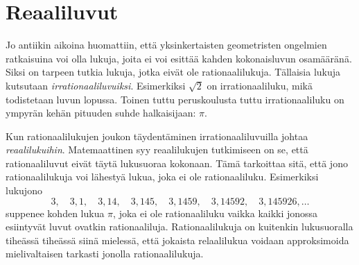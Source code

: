 \chapter{Reaaliluvut}

Jo antiikin aikoina huomattiin, että yksinkertaisten geometristen ongelmien ratkaisuina voi olla lukuja, joita ei voi esittää kahden kokonaisluvun osamääränä. Siksi on tarpeen tutkia lukuja, jotka  eivät ole rationaalilukuja. Tällaisia lukuja kutsutaan \emph{irrationaaliluvuiksi}. Esimerkiksi $\sqrt{2}$ on irrationaaliluku, mikä todistetaan luvun lopussa. Toinen tuttu peruskoulusta tuttu irrationaaliluku on ympyrän kehän pituuden suhde halkaisijaan: $\pi$. 

Kun rationaalilukujen joukon täydentäminen irrationaaliluvuilla johtaa \emph{reaalilukuihin}. Matemaattinen syy reaalilukujen tutkimiseen on se, että rationaaliluvut eivät täytä lukusuoraa kokonaan. Tämä tarkoittaa sitä, että jono rationaalilukuja voi lähestyä lukua, joka ei ole rationaaliluku. Esimerkiksi lukujono
\[
3, \quad 3,1, \quad 3,14, \quad 3,145, \quad 3,1459, \quad 3,14592, \quad 3,145926, \ldots
\]
suppenee kohden lukua $\pi$, joka ei ole rationaaliluku vaikka kaikki jonossa esiintyvät luvut ovatkin rationaaliluja. Rationaalilukuja on kuitenkin lukusuoralla tiheässä tiheässä siinä mielessä, että jokaista relaalilukua voidaan approksimoida mielivaltaisen tarkasti jonolla rationaalilukuja.



